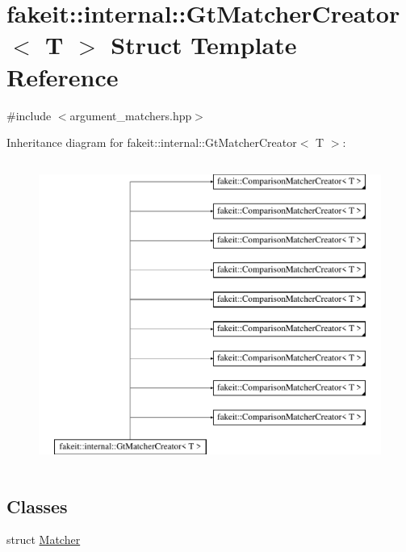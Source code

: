 \hypertarget{structfakeit_1_1internal_1_1GtMatcherCreator}{}\section{fakeit\+::internal\+::Gt\+Matcher\+Creator$<$ T $>$ Struct Template Reference}
\label{structfakeit_1_1internal_1_1GtMatcherCreator}


{\ttfamily \#include $<$argument\+\_\+matchers.\+hpp$>$}

Inheritance diagram for fakeit\+::internal\+::Gt\+Matcher\+Creator$<$ T $>$\+:\begin{figure}[H]
\begin{center}
\leavevmode
\includegraphics[height=10.000000cm]{structfakeit_1_1internal_1_1GtMatcherCreator}
\end{center}
\end{figure}
\subsection*{Classes}
\begin{DoxyCompactItemize}
\item 
struct \mbox{\hyperlink{structfakeit_1_1internal_1_1GtMatcherCreator_1_1Matcher}{Matcher}}
\end{DoxyCompactItemize}
